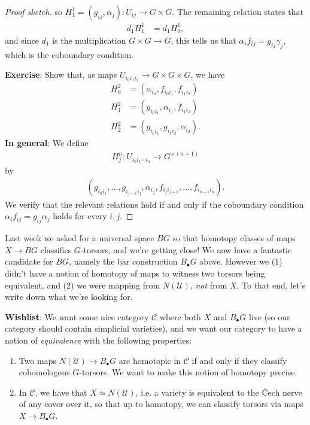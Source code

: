 \documentclass[11pt]{amsart}
\begin{document}
\begin{proof}[Proof sketch]
so $H^1_1 = (g_{ij},\alpha_j) \colon U_{ij} \to G \times G$. The remaining relation states that
\begin{align*}
    d_1 H_1^1 &= d_1 H_0^1,
\end{align*}
and since $d_1$ is the multiplication $G \times G \to G$, this tells us that $\alpha_i f_{ij} = g_{ij}\gamma_j$, which is the coboundary condition.

\textbf{Exercise}: Show that, as maps $U_{i_0 i_1 i_2} \to G \times G \times G$, we have
\begin{align*}
    H_0^2 &= \left( \alpha_{i_0}, f_{i_0 i_1}, f_{i_1 i_2} \right) \\
    H_1^2 &= \left( g_{i_0 i_1}, \alpha_{i_1}, f_{i_1 i_2} \right) \\
    H_2^2 &= \left( g_{i_0 i_1}, g_{i_1 i_2}, \alpha_{i_2} \right).
\end{align*}
%
\textbf{In general}: We define
\begin{align*}
    H^n_j \colon U_{i_0 i_1 \cdots i_n} \to G^{\times (n+1)}
\end{align*}
by
\begin{align*}
    \left(g_{i_0 i_1}, \ldots, g_{i_{j-1} i_j},\alpha_{i_j}, f_{i_j i_{j+1}}, \ldots, f_{i_{n-1} i_n} \right).
\end{align*}
We verify that the relevant relations hold if and only if the coboundary condition $\alpha_i f_{ij} = g_{ij} \alpha_j$ holds for every $i,j$.
%
\end{proof}

\begin{motivation} 
Last week we asked for a universal space $BG$ so that homotopy classes of maps $X \to BG$ classifies $G$-torsors, and we're getting close! We now have a fantastic candidate for $BG$, namely the bar construction $B_\bullet G$ above. However we (1) didn't have a notion of homotopy of maps to witness two torsors being equivalent, and (2) we were mapping from $N(\mathcal{U})$, \textit{not} from $X$. To that end, let's write down what we're looking for.
\end{motivation}

\textbf{Wishlist}: We want some nice category $\mathscr{C}$ where both $X$ and $B_\bullet G$ live (so our category should contain simplicial varieties), and we want our category to have a notion of \textit{equivalence} with the following properties:
\begin{enumerate}
    \item Two maps $N(\mathcal{U}) \to B_\bullet G$ are homotopic in $\mathscr{C}$ if and only if they classify cohomologous $G$-torsors. We want to make this notion of homotopy precise.
    \item In $\mathscr{C}$, we have that $X \simeq N(\mathcal{U})$, i.e. a variety is equivalent to the \v{C}ech nerve of any cover over it, so that up to homotopy, we can classify torsors via maps $X \to B_\bullet G$.
\end{enumerate}
\end{document}
